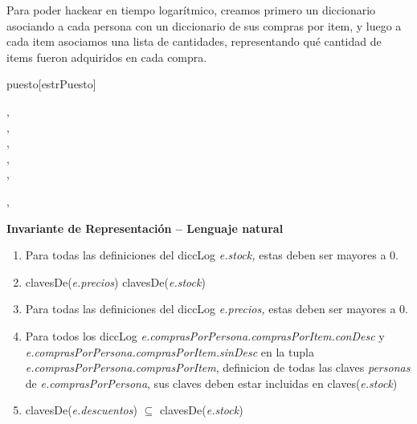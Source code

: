 \documentclass[../main.tex]{subfiles}
\begin{document}
\newpage

\begin{representacion}
{
Para poder hackear en tiempo logarítmico, creamos primero un diccionario asociando a cada persona con un diccionario de sus compras por item, y luego a cada item asociamos una lista de cantidades, representando qué cantidad de items fueron adquiridos en cada compra.

\begin{Estructura}{puesto}[estrPuesto]
    \begin{Tupla}[estrPuesto]
        , \\%
        , \\%
        , \\%
        ,\\%
        ,\\%
    \end{Tupla}

    \begin{Tupla}[comprasPorItem]
        ,\\%
    \end{Tupla}
\end{Estructura}
{\large\bfseries Invariante de Representación -- Lenguaje natural}
\begin{enumerate}

    \item {Para todas las definiciones del diccLog \textit{e.stock,} estas deben ser mayores a 0. %

    }
    \item{ clavesDe(\textit{e.precios}) \igobs clavesDe(\textit{e.stock})%

    }
    \item {Para todas las definiciones del diccLog \textit{e.precios,} estas deben ser mayores a 0.}%

    \item Para todos los diccLog \textit{e.comprasPorPersona.comprasPorItem.conDesc} y \textit{e.comprasPorPersona.comprasPorItem.sinDesc} en la tupla \textit{e.comprasPorPersona.comprasPorItem}, definicion de todas
las claves \textit{personas} de \textit{e.comprasPorPersona}, sus claves deben estar incluidas en claves(\textit{e.stock})
    \item clavesDe(\textit{e.descuentos}) $\subseteq$ clavesDe(\textit{e.stock})%


\end{enumerate}}
\end{representacion}
\end{document}
